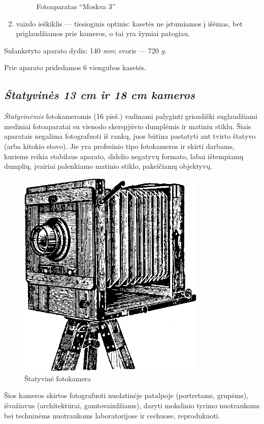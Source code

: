 \documentclass[12pt]{book}
\begin{document}
\begin{enumerate}[1)]
\begin{figure}[h]
					\caption{Fotoaparatas ``Moskva 3''}
					\label{fig:15}
				\end{figure}
				\item vaizdo ieškiklis --- tiesioginis optinis: kasetės ne įstumiamos į išėmas, bet priglaudžiamos prie kameros, o tai yra žymiai patogiau.
			\end{enumerate}

			Sulankstyto aparato dydis: 140   \textit{mm}; svoris --- 720 \textit{g}.

			Prie aparato pridedamos 6 viengubos kasetės.
		\subsection*{\textit{Štatyvinės 13  cm ir 18  cm kameros}}
			\textit{Štatyvinėmis} fotokameromis (16 pieš.) vadinami palyginti griozdiški suglaudžiami mediniai fotoaparatai su vienodo skerspjūvio dumplėmis ir matiniu stiklu. Šiais aparatais negalima fotografuoti iš rankų, juos būtina pastatyti ant tvirto štatyvo (arba kitokio stovo). Jie yra profesinio tipo fotokameros ir skirti darbams, kuriems reikia stabilaus aparato, didelio negatyvų formato, labai ištempiamų dumplių, įvairiai palenkiamo matinio stiklo, pakeičiamų objektyvų.
			\begin{figure}[h]
				\centering
				\includegraphics[width=0.8\textwidth]{16-pav}
				\caption{Štatyvinė fotokamera}
				\label{fig:16}
			\end{figure}
			Šios kameros skirtos fotografuoti nuolatinėje patalpoje (portretams, grupėms), išvažiavus (architektūrai, gamtovaizdžiams), daryti mokslinio tyrimo nuotraukoms bei techninėms nuotraukoms laboratorijose ir cechuose, reprodukuoti.
\end{document}
